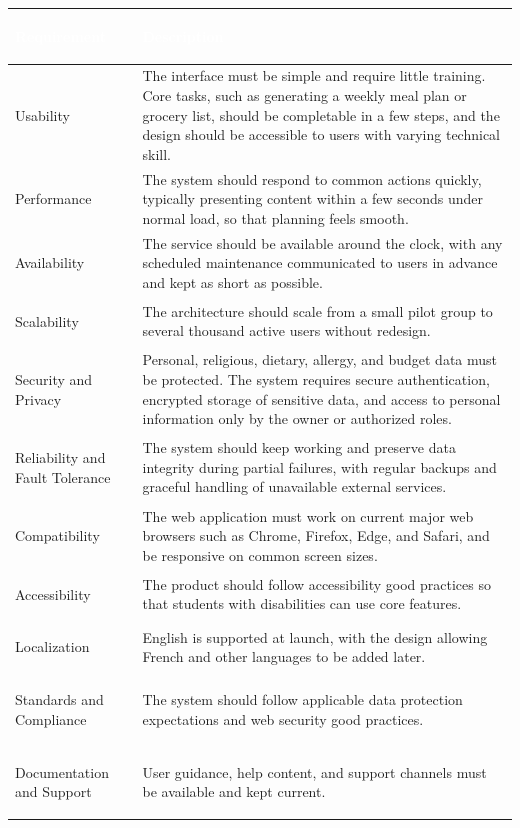 \documentclass[11pt,a4paper]{article}
\begin{document}
\begin{longtable}{>{\bfseries\raggedright\arraybackslash}p{} >{\raggedright\arraybackslash}p{}}
\toprule
\rowcolor{tablehead}\textcolor{white}{\textbf{Requirement}} & \textcolor{white}{\textbf{Description}} \\
\midrule
\endhead
Usability & The interface must be simple and require little training. Core tasks, such as generating a weekly meal plan or grocery list, should be completable in a few steps, and the design should be accessible to users with varying technical skill. \\
\rowcolor{tablealt}
Performance & The system should respond to common actions quickly, typically presenting content within a few seconds under normal load, so that planning feels smooth. \\
Availability & The service should be available around the clock, with any scheduled maintenance communicated to users in advance and kept as short as possible. \\
\rowcolor{tablealt}
Scalability & The architecture should scale from a small pilot group to several thousand active users without redesign. \\
Security and Privacy & Personal, religious, dietary, allergy, and budget data must be protected. The system requires secure authentication, encrypted storage of sensitive data, and access to personal information only by the owner or authorized roles. \\
\rowcolor{tablealt}
Reliability and Fault Tolerance & The system should keep working and preserve data integrity during partial failures, with regular backups and graceful handling of unavailable external services. \\
Compatibility & The web application must work on current major web browsers such as Chrome, Firefox, Edge, and Safari, and be responsive on common screen sizes. \\
\rowcolor{tablealt}
Accessibility & The product should follow accessibility good practices so that students with disabilities can use core features. \\
Localization & English is supported at launch, with the design allowing French and other languages to be added later. \\
\rowcolor{tablealt}
Standards and Compliance & The system should follow applicable data protection expectations and web security good practices. \\
Documentation and Support & User guidance, help content, and support channels must be available and kept current. \\
\bottomrule
\end{longtable}
\end{document}

